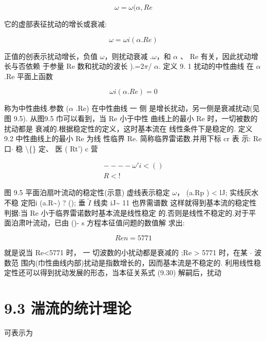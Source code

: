 \begin{equation*}\omega =\omega (\alpha  ,  Re\tag{9.30b}\end{equation*}

它的虚部表征扰动的增长或衰减:

\begin{equation*}\omega =\omega i (\alpha  .Re)\tag{9.31}\end{equation*}

正值的创表示扰动增长，负值 $\omega$，则扰动衰减 .$\omega$，和 $\alpha$ 、 Re 有关，因此扰动增长与否依赖 于参量 Re 数和扰动的波长 ).=2$\pi$/ $\alpha$. 定义 9. 1 扰动的中性曲线 在 $\alpha$ .Re 平面上函数

\begin{equation*}\omega i (\alpha  .Re) = 0\tag{9.32}\end{equation*}

称为中性曲线.参数 ($\alpha$ .Re) 在中性曲线 一 侧 是增长扰动，另一侧是衰减扰动(见 图 9.5). 从图9.5 巾可以看到，当 Re 小于中性 曲线上的最小 Re 时，一切被数的扰动都是 衰减的.根据稳定性的定义，这时基本流在 线性条件下是稳定的. 定义 9.2 中性曲线上的最小 Re 为线 性临界 Re. 简称临界雷诺数.并用下标 cr 表 示: Re口$\cdot $ 稳 \textbackslash\{\} 定、 医 ( Rt') c 营

\begin{gather*}
----\omega 'i <()\\
R<!
\end{gather*}

图 9.5 平面泊扇叶流动的稳定性(示意) 虚线表示稳定 $\omega$， (a.Rp ) < lJ; 实线灰水 不稳 定阳i (a.R\textasciitilde{}) ? (); 垂 $\tilde{I}$ 线卖 iJ\textasciitilde{} 11 也界需谱数 这样就得到基本流的稳定性判据:当 Re 小于临界雷诺数时基本流是线性稳定 的.否则是线性不稳定的.对于平面泊肃叶流动，已由 ()- s 方程本征值问题的数值解 求出:

\begin{equation*}Re n = 5771\tag{9.33}\end{equation*}

就是说当 Re<5771 时， 一 切波数的小扰动都是衰减的 ;Re > 5771 时，在某 $\cdot $ 波数范 围内(巾性曲线内部)扰动是指数增长的，因而基本流是不稳定的. 利用线性稳定性还可以得到扰动发展的形态，当本征关系式 (9.30) 解嗣后，扰动

\section*{9.3  湍流的统计理论}

可表示为


